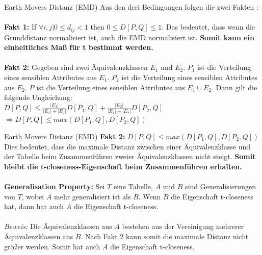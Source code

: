 \begin{frame}{Earth Movers Distanz (EMD)}
	Aus den drei Bedingungen folgen die zwei Fakten \cite{Li2007t-closseness}:\\
	\ \\
	\textbf{Fakt 1:} If $\forall i,j | 0 \le d_{ij} < 1$ then $0 \le D[P,Q]  \le 1$. 
	Das bedeutet, dass wenn die Grunddistanz normalisiert ist, auch die EMD normalisiert ist. \textbf{Somit kann ein einheitliches Maß für t bestimmt werden.}\\
	\ \\
	\textbf{Fakt 2:} Gegeben sind zwei Äquivalenzklassen $E_1$ und $E_2$.
	$P_1$ ist die Verteilung eines sensiblen Attributes aus $E_1$.
	$P_2$ ist die Verteilung eines sensiblen Attributes aus $E_2$.
	$P$ ist die Verteilung eines sensiblen Attributes aus $E_1 \cup E_2$. Dann gilt die folgende Ungleichung: \\
	$D[P,Q] \le \frac{|E_1|}{|E_1|+|E_2|}D[P_1,Q] + \frac{|E_2|}{|E_1|+|E_2|}D[P_2,Q]$\\
	$\Rightarrow D[P,Q] \le max(D[P_1,Q], D[P_2,Q])$ 
\end{frame}

\begin{frame}{Earth Movers Distanz (EMD)}
	\textbf{Fakt 2:} $D[P,Q] \le max(D[P_1,Q], D[P_2,Q])$ 
	Dies bedeutet, dass die maximale Distanz zwischen einer Äquivalenzklasse und der Tabelle beim Zusammenführen zweier Äquivalenzklassen nicht steigt. \textbf{Somit bleibt die t-closeness-Eigenschaft beim Zusammenführen erhalten.} \\ 
	\ \\
	\textbf{Generalisation Property:} Sei $T$ eine Tabelle, $A$ und $B$ sind Generalisierungen von $T$, wobei $A$ mehr generalisiert ist als $B$. Wenn $B$ die Eigenschaft t-closeness hat, dann hat auch $A$ die Eigenschaft t-closeness.\\
	\ \\
	\textit{Beweis:} Die Äquivalenzklassen aus $A$ bestehen aus der Vereinigung mehrerer Äquivalenzklassen aus $B$. Nach Fakt 2 kann somit die maximale Distanz nicht größer werden. Somit hat auch $A$ die Eigenschaft t-closeness.  
\end{frame}

